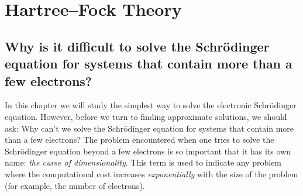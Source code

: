 \documentclass[../Main/chem371-notes.tex]{subfiles}
\begin{document}
\chapter{Hartree--Fock Theory}

\section{Why is it difficult to solve the Schr\"{o}dinger equation for systems that contain more than a few electrons?}


In this chapter we will study the simplest way to solve the electronic Schr\"{o}dinger equation.
However, before we turn to finding approximate solutions, we should ask: Why can't we solve the Schr\"{o}dinger equation for systems that contain more than a few electrons?
The problem encountered when one tries to solve the Schr\"{o}dinger equation beyond a few electrons is so important that it has its own name: \emph{the curse of dimensionality}.
This term is used to indicate any problem where the computational cost increases \emph{exponentially} with the size of the problem (for example, the number of electrons).
\end{document}
